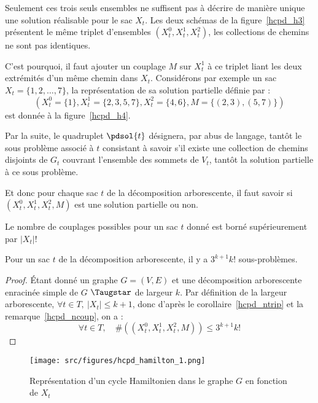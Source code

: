 Seulement ces trois seuls ensembles ne suffisent pas à décrire de manière unique une solution
réalisable pour le sac $X_t$. Les deux schémas de la figure~\ref{hcpd_h3} présentent le même triplet
d'ensembles $(X_t^0, X_t^1, X_t^2)$, les collections de chemins ne sont pas identiques.

C'est pourquoi, il faut ajouter un couplage $M$ sur $X_t^1$ à ce triplet liant les deux extrémités d'un même chemin
dans $X_t$. Considérons par exemple un sac $X_t = \{1, 2, \dots, 7\}$, la représentation de sa
solution partielle définie par : \[
    (X_t^0 = \{1\}, X_t^1 = \{2, 3, 5, 7\}, X_t^2 = \{4, 6\}, M = \{(2,3), (5,7)\})
\] est donnée à la figure~\ref{hcpd_h4}.

Par la suite, le quadruplet $\pdsol{t}$ désignera, par abus de langage, tantôt le sous problème
associé à $t$ consistant à savoir s'il existe une collection de chemins disjoints de $G_t$ couvrant
l'ensemble des sommets de $V_t$, tantôt la solution partielle à ce sous problème.

Et donc pour chaque sac $t$ de la décomposition arborescente, il faut savoir si $(X_t^0, X_t^1,
X_t^2, M)$ est une solution partielle ou non.

\begin{nrmq}
    \label{hcpd_ncoup}
    Le nombre de couplages possibles pour un sac $t$ donné est borné supérieurement par $|X_t|!$
\end{nrmq}

\begin{nlemma}
    \label{hcpd_npb}
    Pour un sac $t$ de la décomposition arborescente, il y a $3^{k+1} k!$ sous-problèmes.
\end{nlemma}

\begin{proof}
    Étant donné un graphe $G=(V,E)$ et une décomposition arborescente enracinée simple de $G$
    $\Taugstar$ de largeur $k$. Par définition de la largeur arborescente, $\forall t \in T,\ |X_t|
    \leq k + 1$, donc d'après le corollaire~\ref{hcpd_ntrip} et la remarque~\ref{hcpd_ncoup}, on a : \[
        \forall t \in T,\quad \#((X_t^0, X_t^1, X_t^2, M)) \leq 3^{k+1} k!
    \]
\end{proof}

\begin{figure}
    \begin{center}
        \texttt{[image: src/figures/hcpd\_hamilton\_1.png]}
        \caption{Représentation d'un cycle Hamiltonien dans le graphe $G$ en fonction de $X_t$}
        \label{hcpd_h1}
    \end{center}
\end{figure}

